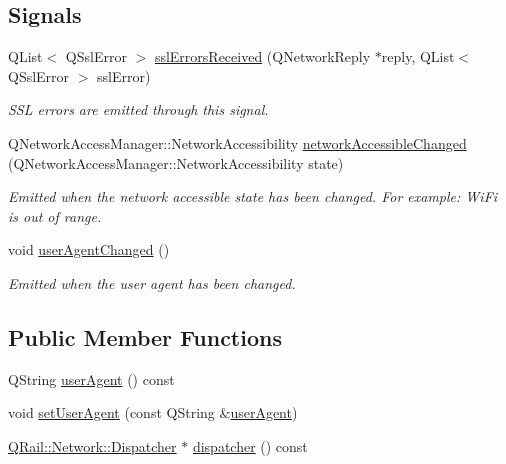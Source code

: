 \subsection*{Signals}
\begin{DoxyCompactItemize}
\item 
Q\+List$<$ Q\+Ssl\+Error $>$ \mbox{\hyperlink{classQRail_1_1Network_1_1Manager_a0404bf0008a42108b6e72ec5da12d02f}{ssl\+Errors\+Received}} (Q\+Network\+Reply $\ast$reply, Q\+List$<$ Q\+Ssl\+Error $>$ ssl\+Error)
\begin{DoxyCompactList}\small\item\em S\+SL errors are emitted through this signal. \end{DoxyCompactList}\item 
Q\+Network\+Access\+Manager\+::\+Network\+Accessibility \mbox{\hyperlink{classQRail_1_1Network_1_1Manager_af81d89d8572d74d039400ec2e05f9894}{network\+Accessible\+Changed}} (Q\+Network\+Access\+Manager\+::\+Network\+Accessibility state)
\begin{DoxyCompactList}\small\item\em Emitted when the network accessible state has been changed. For example\+: Wi\+Fi is out of range. \end{DoxyCompactList}\item 
void \mbox{\hyperlink{classQRail_1_1Network_1_1Manager_a7041109a640094b8aaeb430e6b09c9bc}{user\+Agent\+Changed}} ()
\begin{DoxyCompactList}\small\item\em Emitted when the user agent has been changed. \end{DoxyCompactList}\end{DoxyCompactItemize}
\subsection*{Public Member Functions}
\begin{DoxyCompactItemize}
\item 
Q\+String \mbox{\hyperlink{classQRail_1_1Network_1_1Manager_a8163075df6f472c3ae69e0cfa67a7da7}{user\+Agent}} () const
\item 
void \mbox{\hyperlink{classQRail_1_1Network_1_1Manager_a35063d645223fad68f5b4ec56d5fbb96}{set\+User\+Agent}} (const Q\+String \&\mbox{\hyperlink{classQRail_1_1Network_1_1Manager_a8163075df6f472c3ae69e0cfa67a7da7}{user\+Agent}})
\item 
\mbox{\hyperlink{classQRail_1_1Network_1_1Dispatcher}{Q\+Rail\+::\+Network\+::\+Dispatcher}} $\ast$ \mbox{\hyperlink{classQRail_1_1Network_1_1Manager_a21b6ceec7b0c085ffc74a9a2ced44688}{dispatcher}} () const
\end{DoxyCompactItemize}
